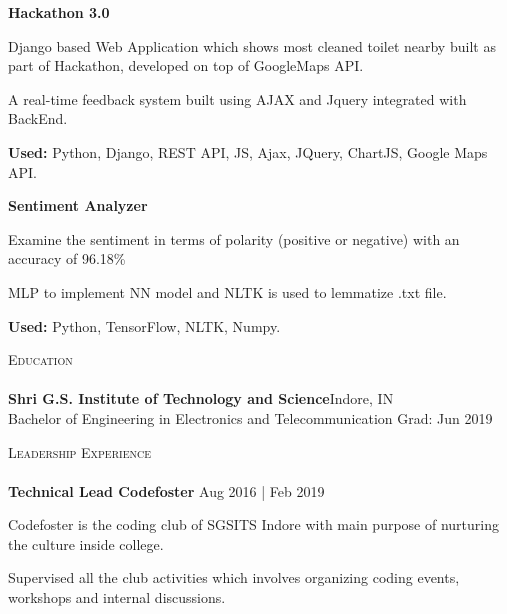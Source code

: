 \documentclass[a4paper]{article}
\newcommand{\lineunder} {
    \vspace*{-8pt} \\
    \hspace*{-18pt} \hrulefill \\
}
\newcommand{\header} [1] {
    {\hspace*{-18pt}\vspace*{6pt} \textsc{#1}}
    \vspace*{-6pt} \lineunder
}
\begin{document}
\textbf{Hackathon 3.0 \href{https://github.com/techytoes/publicSanitation}{\faGithub}}
\vspace{-1mm}
\begin{itemize}
	\small{\item Django based Web Application which shows most cleaned toilet nearby built as part of Hackathon, developed on top of GoogleMaps API.}
	\vspace{-1mm}
	\small{\item A real-time feedback system built using AJAX and Jquery integrated with BackEnd.}
	\vspace{-1mm}
	\small{\item \textbf{Used:} Python, Django, REST API, JS, Ajax, JQuery, ChartJS, Google Maps API.}
	\vspace{-1mm}
\end{itemize}

\textbf{Sentiment Analyzer \href{https://github.com/techytoes/Sentiment-Analyzer}{\faGithub}}
\vspace{-1mm}
\begin{itemize}
	\small{\item Examine the sentiment in terms of polarity (positive or negative) with an accuracy of 96.18\%}
	\vspace{-1mm}
	\small{\item MLP to implement NN model and NLTK is used to lemmatize .txt file.}
	\vspace{-1mm}
	\small{\item \textbf{Used:}  Python, TensorFlow, NLTK, Numpy.}
	\vspace{-1mm}
\end{itemize}
\vspace*{1mm}


\header{Education}
\textbf{Shri G.S. Institute of Technology and Science}\hfill Indore, IN\\
Bachelor of Engineering in Electronics and Telecommunication \hfill Grad: Jun 2019\\
\vspace*{1mm}
\vspace*{1mm}


\header{Leadership Experience}
\textbf{Technical Lead  \hfill Codefoster} \hfill Aug 2016 | Feb 2019\\
\vspace{-1mm}
\begin{itemize} \itemsep 1pt
	\small{\item Codefoster is the coding club of SGSITS Indore with main purpose of nurturing the culture inside college.}
	\vspace{-5mm}
	\small{\item Supervised all the club activities which involves organizing coding events, workshops and internal discussions.}
\end{itemize}
\end{document}
